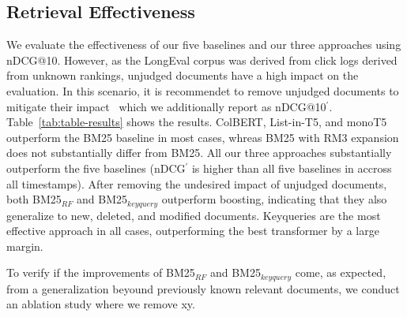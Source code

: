 \subsection{Retrieval Effectiveness}




We evaluate the effectiveness of our five baselines and our three approaches using nDCG@10. However, as the LongEval corpus was derived from click logs derived from unknown rankings, unjudged documents have a high impact on the evaluation. In this scenario, it is recommendet to remove unjudged documents to mitigate their impact~\cite{sakai:2007} which we additionally report as nDCG@10$^{'}$. Table~\ref{tab:table-results} shows the results. ColBERT, List-in-T5, and monoT5 outperform the BM25 baseline in most cases, whreas BM25 with RM3 expansion does not substantially differ from BM25. All our three approaches substantially outperform the five baselines (nDCG$^{'}$ is higher than all five baselines in accross all timestamps). After removing the undesired impact of unjudged documents, both BM25$_{RF}$ and BM25$_{keyquery}$ outperform boosting, indicating that they also generalize to new, deleted, and modified documents. Keyqueries are the most effective approach in all cases, outperforming the best transformer by a large margin.



To verify if the improvements of BM25$_{RF}$ and BM25$_{keyquery}$ come, as expected, from a generalization beyound previously known relevant documents, we conduct an ablation study where we remove xy.
